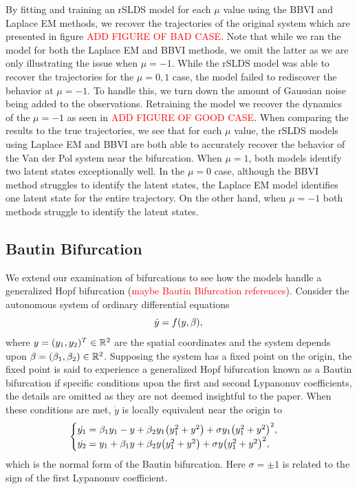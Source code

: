 By fitting and training an rSLDS model for each $\mu$ value using the BBVI and Laplace EM methods, we recover the trajectories of the original system which are presented in figure \textcolor{red}{ADD FIGURE OF BAD CASE}. Note that while we ran the model for both the Laplace EM and BBVI methods, we omit the latter as we are only illustrating the issue when $\mu=-1$. While the rSLDS model was able to recover the trajectories for the $\mu=0,1$ case, the model failed to rediscover the behavior at $\mu = -1$. To handle this, we turn down the amount of Gaussian noise being added to the observations. Retraining the model we recover the dynamics of the $\mu = -1$ as seen in \textcolor{red}{ADD FIGURE OF GOOD CASE}. When comparing the results to the true trajectories, we see that for each $\mu$ value, the rSLDS models using Laplace EM and BBVI are both able to accurately recover the behavior of the Van der Pol system near the bifurcation. When $\mu = 1$, both models identify two latent states exceptionally well. In the $\mu = 0$ case, although the BBVI method struggles to identify the latent states, the Laplace EM model identifies one latent state for the entire trajectory. On the other hand, when $\mu = -1$ both methods struggle to identify the latent states.




\subsection{Bautin Bifurcation}
We extend our examination of bifurcations to see how the models handle a generalized Hopf bifurcation (\textcolor{red}{maybe Bautin Bifurcation references}). Consider the autonomous system of ordinary differential equations
\begin{equation}
    \dot{y} = f{\left(y, \beta\right)},
\end{equation}
where $y = (y_1,y_2)^T \in \mathbb{R}^2$ are the spatial coordinates and the system depends upon $\beta = (\beta_1,\beta_2) \in \mathbb{R}^2$. Supposing the system has a fixed point on the origin, the fixed point is said to experience a generalized Hopf bifurcation known as a Bautin bifurcation if specific conditions upon the first and second Lypanonuv coefficients, the details are omitted as they are not deemed insightful to the paper. When these conditions are met, $\dot{y}$ is locally equivalent near the origin to 
\begin{equation}
    \begin{cases}
        \dot{y_1} = \beta_1 y_1 - y + \beta_2 y_1 {\left(y_1^2 + y^2\right)} + \sigma y_1 {\left(y_1^2 + y^2\right)}^2,\\
        \dot{y_2} = y_1 + \beta_1 y + \beta_2 y {\left(y_1^2 + y^2\right)} + \sigma y {\left(y_1^2 + y^2\right)}^2,
    \end{cases}
\end{equation}
which is the normal form of the Bautin bifurcation. Here $\sigma = \pm 1$ is related to the sign of the first Lypanonuv coefficient. 

